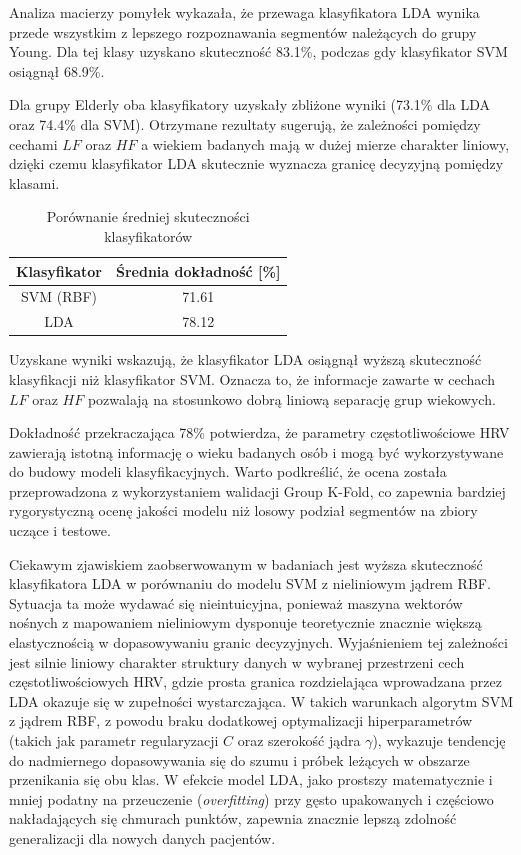 \documentclass[a4paper,12pt]{article}
\begin{document}
Analiza macierzy pomyłek wykazała, że przewaga klasyfikatora LDA wynika przede wszystkim z lepszego rozpoznawania segmentów należących do grupy Young. Dla tej klasy uzyskano skuteczność 83.1\%, podczas gdy klasyfikator SVM osiągnął 68.9\%.

Dla grupy Elderly oba klasyfikatory uzyskały zbliżone wyniki (73.1\% dla LDA oraz 74.4\% dla SVM). Otrzymane rezultaty sugerują, że zależności pomiędzy cechami $LF$ oraz $HF$ a wiekiem badanych mają w dużej mierze charakter liniowy, dzięki czemu klasyfikator LDA skutecznie wyznacza granicę decyzyjną pomiędzy klasami.

\begin{table}[H]
\centering
\caption{Porównanie średniej skuteczności klasyfikatorów}
\begin{tabular}{|c|c|}
\hline
\textbf{Klasyfikator} & \textbf{Średnia dokładność [\%]} \\
\hline
SVM (RBF) & 71.61 \\
\hline
LDA & 78.12 \\
\hline
\end{tabular}
\end{table}

Uzyskane wyniki wskazują, że klasyfikator LDA osiągnął wyższą skuteczność klasyfikacji niż klasyfikator SVM. Oznacza to, że informacje zawarte w cechach $LF$ oraz $HF$ pozwalają na stosunkowo dobrą liniową separację grup wiekowych.

Dokładność przekraczająca 78\% potwierdza, że parametry częstotliwościowe HRV zawierają istotną informację o wieku badanych osób i mogą być wykorzystywane do budowy modeli klasyfikacyjnych.
Warto podkreślić, że ocena została przeprowadzona z wykorzystaniem walidacji Group K-Fold, co zapewnia bardziej rygorystyczną ocenę jakości modelu niż losowy podział segmentów na zbiory uczące i testowe.

Ciekawym zjawiskiem zaobserwowanym w badaniach jest wyższa skuteczność klasyfikatora LDA w porównaniu do modelu SVM z nieliniowym jądrem RBF. Sytuacja ta może wydawać się nieintuicyjna, ponieważ maszyna wektorów nośnych z mapowaniem nieliniowym dysponuje teoretycznie znacznie większą elastycznością w dopasowywaniu granic decyzyjnych. Wyjaśnieniem tej zależności jest silnie liniowy charakter struktury danych w wybranej przestrzeni cech częstotliwościowych HRV, gdzie prosta granica rozdzielająca wprowadzana przez LDA okazuje się w zupełności wystarczająca. W takich warunkach algorytm SVM z jądrem RBF, z powodu braku dodatkowej optymalizacji hiperparametrów (takich jak parametr regularyzacji $C$ oraz szerokość jądra $\gamma$), wykazuje tendencję do nadmiernego dopasowywania się do szumu i próbek leżących w obszarze przenikania się obu klas. W efekcie model LDA, jako prostszy matematycznie i mniej podatny na przeuczenie (\textit{overfitting}) przy gęsto upakowanych i częściowo nakładających się chmurach punktów, zapewnia znacznie lepszą zdolność generalizacji dla nowych danych pacjentów.
\end{document}
